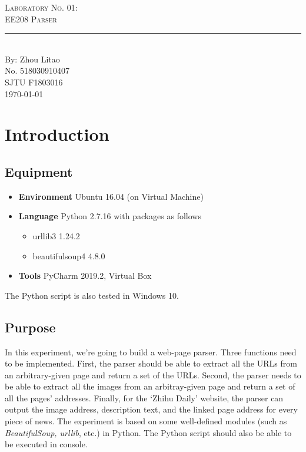 \documentclass{article}
\newcommand{\labno}{01}
\newcommand{\labtitle}{EE208 Parser}
\newcommand{\authorname}{Zhou Litao}
\newcommand{\studentno}{518030910407}
\newcommand{\classno}{F1803016}
\begin{document}
\begin{center}
{\LARGE \textsc{Laboratory No. \labno:} \\ \vspace{4pt}}
{\Large \textsc{\labtitle} \\ \vspace{4pt}} 
\rule[13pt]{\textwidth}{1pt} \\ \vspace{15pt}
{\large By: \authorname \\ \vspace{10pt}
No. \studentno \\ \vspace{10pt}
SJTU \classno \\ \vspace{10pt}
\today \vspace{20pt}}
\end{center}



\section{Introduction}

\subsection{Equipment}
\begin{itemize}
\item\textbf{Environment} Ubuntu 16.04 (on Virtual Machine)
\item\textbf{Language} Python 2.7.16 with packages as follows
	\begin{itemize}
	\item urllib3 1.24.2
	\item beautifulsoup4 4.8.0
	\end{itemize}
\item\textbf{Tools} PyCharm 2019.2, Virtual Box
\end{itemize}
The Python script is also tested in Windows 10.

\subsection{Purpose}
In this experiment, we're going to build a web-page parser. Three functions need to be implemented. First, the parser should be able to extract all the URLs from an arbitrary-given page and return a set of the URLs. Second, the parser needs to be able to extract all the images from an arbitray-given page and return a set of all the pages' addresses. Finally, for the `Zhihu Daily' website, the parser can output the image address, description text, and the linked page address for every piece of news. The experiment is based on some well-defined modules (such as \textit{BeautifulSoup, urllib}, etc.) in Python. The Python script should also be able to be executed in console.
\end{document}
